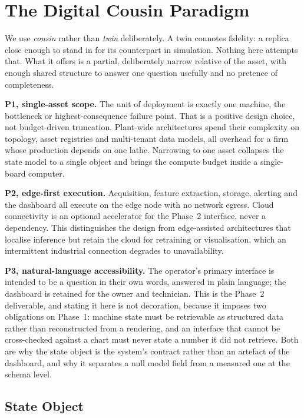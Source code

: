 \documentclass[conference]{IEEEtran}
\begin{document}
\section{The Digital Cousin Paradigm}
\label{sec:para}

We use \emph{cousin} rather than \emph{twin} deliberately. A twin connotes
fidelity: a replica close enough to stand in for its counterpart in
simulation. Nothing here attempts that. What it offers is a partial,
deliberately narrow relative of the asset, with enough shared structure to
answer one question usefully and no pretence of completeness.

\textbf{P1, single-asset scope.} The unit of deployment is exactly one
machine, the bottleneck or highest-consequence failure point. That is a
positive design choice, not budget-driven truncation. Plant-wide
architectures spend their complexity on topology, asset registries and
multi-tenant data models, all overhead for a firm whose production depends
on one lathe. Narrowing to one asset collapses the state model to a single
object and brings the compute budget inside a single-board computer.

\textbf{P2, edge-first execution.} Acquisition, feature extraction, storage,
alerting and the dashboard all execute on the edge node with no network
egress. Cloud connectivity is an optional accelerator for the Phase~2
interface, never a dependency. This distinguishes the design from edge-assisted
architectures that localise inference but retain the cloud for retraining or
visualisation, which an intermittent industrial connection degrades to
unavailability.

\textbf{P3, natural-language accessibility.} The operator's primary
interface is intended to be a question in their own words, answered in plain
language; the dashboard is retained for the owner and technician. This is
the Phase~2 deliverable, and stating it here is not decoration, because it
imposes two obligations on Phase~1: machine state must be retrievable as
structured data rather than reconstructed from a rendering, and an interface
that cannot be cross-checked against a chart must never state a number it
did not retrieve. Both are why the state object is the system's contract
rather than an artefact of the dashboard, and why it separates a null model
field from a measured one at the schema level.

\subsection{State Object}
\label{sec:state}
\end{document}

